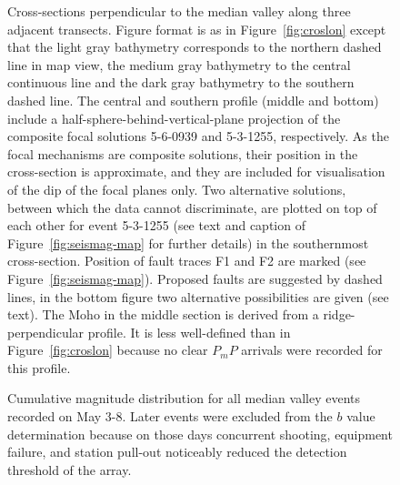 \documentclass[jgr]{agu2001}
\renewcommand{\includefig}[2]{}
\newlength{\tw}
\begin{document}
\clearpage

\begin{figure}

\includefig{depth-map/depth-map-1}{16pc} \includefig{cros/cros-1}{23pc} %

\includefig{depth-map/depth-map-2}{16pc} \includefig{cros/cros-2}{23pc} %

\includefig{depth-map/depth-map-3}{16pc} \includefig{cros/cros-3}{23pc} %

\caption{Cross-sections perpendicular to the median valley along three
adjacent transects.  Figure format is as in
Figure~\protect\ref{fig:croslon} except that the light gray bathymetry
corresponds to  the northern dashed line in map view,
the medium gray bathymetry  to the central continuous line and the
dark gray bathymetry to the southern dashed line. The central and
southern profile (middle and bottom) include a
half-sphere-behind-vertical-plane projection of the
composite focal solutions 5-6-0939 and 5-3-1255, respectively. As the
focal mechanisms are composite solutions, their position in the
cross-section is approximate, and they are included for
visualisation of the dip of the focal planes only. Two alternative
solutions, between which the data cannot discriminate, are plotted on
top of each other for
event 5-3-1255 (see text and caption of
Figure~\protect\ref{fig:seismag-map} for further details) in the
southernmost cross-section. 
Position of fault traces  F1 and F2 are marked (see Figure~\protect\ref{fig:seismag-map}).
Proposed faults are suggested by dashed lines, in the bottom figure two alternative possibilities are given
 (see text). The Moho in the middle section is derived from a
ridge-perpendicular profile.  It is less well-defined than in
Figure~\protect\ref{fig:croslon} because no clear $P_mP$ arrivals were
recorded for this profile.}

\label{fig:croslat}
\end{figure}

\begin{figure}

\includefig{magnitude/magnitude}{20pc} %
\caption{Cumulative magnitude distribution for all median valley events recorded on
May 3-8.  Later events were excluded from the $b$ value
determination because on those days concurrent shooting, equipment
failure, and station pull-out noticeably  reduced the detection
threshold of the array.   }
\label{fig:magnitude}
\end{figure}
\end{document}
